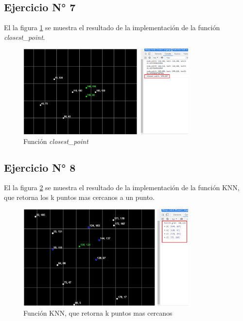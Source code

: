 \documentclass{article}
\begin{document}
\subsection{Ejercicio N° 7}
El la figura \ref{fig:ejercicio_07} se muestra el resultado de la implementación de la función \textit{closest\_point}.
\begin{figure}[h!]
	\centering
	\includegraphics[width=0.8\textwidth]{img/ejercicio_07.png}
	\caption{Función \textit{closest\_point}}
	\label{fig:ejercicio_07}
\end{figure}

\clearpage
\subsection{Ejercicio N° 8}
El la figura \ref{fig:ejercicio_08} se muestra el resultado de la implementación de la función KNN, que retorna los k puntos mas cercanos a un punto.
\begin{figure}[h!]
	\centering
	\includegraphics[width=0.8\textwidth]{img/ejercicio_08.png}
	\caption{Función KNN, que retorna k puntos mas cercanos}
	\label{fig:ejercicio_08}
\end{figure}

\clearpage
\end{document}
